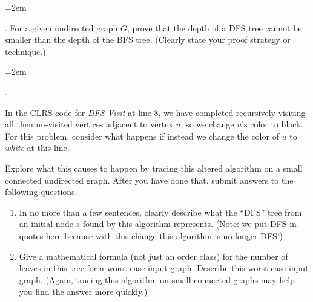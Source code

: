 \documentclass[12pt]{article}
\newcounter{quesnum}
\newcommand{\question}[2][??]{
\begin{list}{\labelitemi}{\leftmargin=2em}
\item [\arabic{quesnum}.] {#2}
\end{list}
\addtocounter{quesnum}{1}
}
\begin{document}
\question[1]{
 For a given undirected graph $G$, prove that the depth of a DFS tree cannot be smaller than the depth of the BFS tree.  (Clearly state your proof strategy or technique.)
}










\iffalse

\question[1]{
In the CLRS code for {\em DFS-Visit} at line 8,  we have completed recursively visiting all then un-visited vertices adjacent to vertex $u$, so we change $u$'s color to black.  For this problem, consider what happens if instead we change the color of $u$ to {\em white} at this line.

Explore what this causes to happen by tracing this altered algorithm on a small connected undirected graph.  After you have done that, submit answers to the following questions.

\begin{enumerate}
\renewcommand{\theenumi}{\Alph{enumi}}
\item In no more than a few sentences, clearly describe what the ``DFS'' tree from an initial node $s$ found by this algorithm represents.  (Note:  we put DFS in quotes here because with this change this algorithm is no longer DFS!)
\item Give a mathematical formula (not just an order class) for the number of leaves in this tree for a worst-case input graph.  Describe this worst-case input graph.  (Again, tracing this algorithm on small connected graphs may help you find the answer more quickly.)
\end{enumerate}

}
\end{document}
